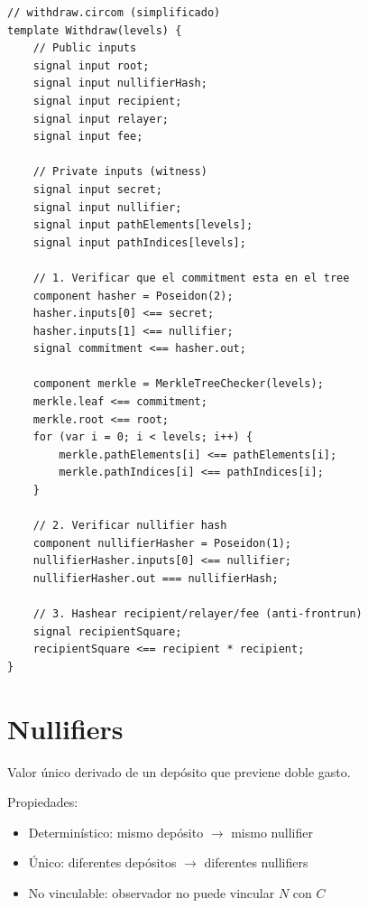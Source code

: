 \documentclass[11pt,a4paper,twoside]{book}
\begin{document}
\begin{example}
\begin{lstlisting}[style=circom]
// withdraw.circom (simplificado)
template Withdraw(levels) {
    // Public inputs
    signal input root;
    signal input nullifierHash;
    signal input recipient;
    signal input relayer;
    signal input fee;
    
    // Private inputs (witness)
    signal input secret;
    signal input nullifier;
    signal input pathElements[levels];
    signal input pathIndices[levels];
    
    // 1. Verificar que el commitment esta en el tree
    component hasher = Poseidon(2);
    hasher.inputs[0] <== secret;
    hasher.inputs[1] <== nullifier;
    signal commitment <== hasher.out;
    
    component merkle = MerkleTreeChecker(levels);
    merkle.leaf <== commitment;
    merkle.root <== root;
    for (var i = 0; i < levels; i++) {
        merkle.pathElements[i] <== pathElements[i];
        merkle.pathIndices[i] <== pathIndices[i];
    }
    
    // 2. Verificar nullifier hash
    component nullifierHasher = Poseidon(1);
    nullifierHasher.inputs[0] <== nullifier;
    nullifierHasher.out === nullifierHash;
    
    // 3. Hashear recipient/relayer/fee (anti-frontrun)
    signal recipientSquare;
    recipientSquare <== recipient * recipient;
}
\end{lstlisting}
\end{example}

\section{Nullifiers}

\begin{definition}[Nullifier]
Valor \'unico derivado de un dep\'osito que previene doble gasto.
\end{definition}

Propiedades:
\begin{itemize}
    \item Determin\'istico: mismo dep\'osito $\to$ mismo nullifier
    \item \'Unico: diferentes dep\'ositos $\to$ diferentes nullifiers
    \item No vinculable: observador no puede vincular $N$ con $C$
\end{itemize}
\end{document}
